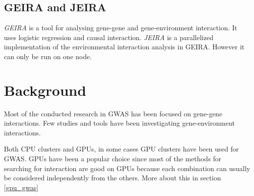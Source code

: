 \documentclass[10pt,a4paper]{report}
\begin{document}
\section{GEIRA and JEIRA}
\emph{GEIRA} is a tool for analysing gene-gene and gene-environment interaction. It uses logistic regression and causal interaction\cite{geira}. \emph{JEIRA} is a parallelized implementation of the environmental interaction analysis in GEIRA. However it can only be run on one node.

\clearpage
\chapter{Background}

Most of the conducted research in GWAS has been focused on gene-gene interactions. Few studies and tools have been investigating gene-environment interactions.

Both CPU clusters\cite{biforce} and GPUs\cite{gwis,gboost,gmdr_gpu,cuda_lr,genie_2012,plink_gpu}, in some cases GPU clusters\cite{gwis_conf} have been used for GWAS. GPUs have been a popular choice since most of the methods for searching for interaction are good on GPUs because each combination can usually be considered independently from the others. More about this in section \ref{gpu_gwas}
\end{document}
